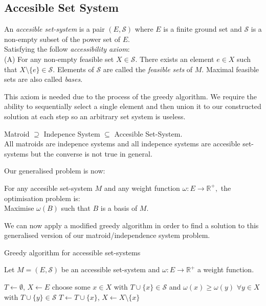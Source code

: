 \documentclass[../main.tex]{subfiles}
\begin{document}
\subsection{Accesible Set System}
\begin{defn}
An \textit{accesible set-system} is a pair $(E,\mathcal{S})$ where $E$ is a finite ground set and $\mathcal{S}$ is a non-empty subset of the power set of $E.$\\
Satisfying the follow \textit{accessibility axiom}:\\
(A) For any non-empty feasible set $X \in \mathcal{S}.$ There exists an element $e \in X$ such that $X \setminus \{e\} \in \mathcal{S}.$
Elements of $\mathcal{S}$ are called the \textit{feasible sets} of $M.$ Maximal feasible sets are also called \textit{bases}.
\end{defn}

This axiom is needed due to the process of the greedy algorithm. We require the ability to sequentially select a single element and then union it to our constructed solution at each step so an arbitrary set system is useless.

\begin{rem}
Matroid $\supseteq$ Indepence System $\subseteq$ Accesible Set-System.\\
All matroids are indepence systems and all indepence systems are accesible set-systems but the converse is not true in general.
\end{rem}

\noindent Our generalised problem is now:
\begin{prop}
For any accesible set-system $M$ and any weight function $\omega:E \longrightarrow \mathbb{R^+},$ the optimisation problem is:\\
 Maximise $\omega(B)$ such that $B$ is a basis of $M.$
\end{prop}
\noindent We can now apply a modified greedy algorithm in order to find a solution to this generalised version of our matroid/independence system problem.

\begin{algorithm}[H]
\caption{Greedy algorithm for accessible set-systems}\label{modified_greedy}
Let $M=(E,\mathcal{S})$ be an accessible set-system and $\omega:E \longrightarrow \mathbb{R^+}$ a weight function.
\begin{algorithmic}[1]
\State $T \gets \emptyset$, $X \gets E$
\State choose some $x \in X$ with $T \cup \{x\} \in \mathcal{S}$ and
\State $\omega(x) \geq \omega(y)$ $\forall y \in X$ with $T \cup \{y\} \in \mathcal{S}$
\State $T \gets T \cup \{x\}$, $X \gets X \setminus \{x\}$
\EndWhile
\EndProcedure
\end{algorithmic}
\end{algorithm}
\end{document}
